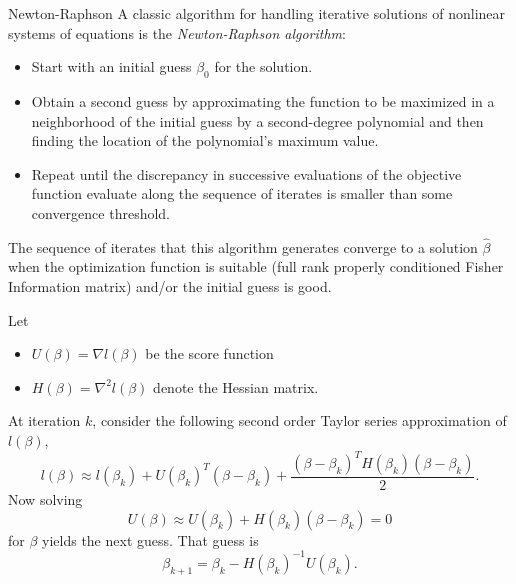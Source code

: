\documentclass[
  ignorenonframetext,
]{beamer}
\providecommand{\tightlist}{%
  \setlength{\itemsep}{0pt}\setlength{\parskip}{0pt}}
\begin{document}
\begin{frame}{Newton-Raphson}
\protect\hypertarget{newton-raphson}{}
A classic algorithm for handling iterative solutions of nonlinear
systems of equations is the \emph{Newton-Raphson algorithm}:

\begin{itemize}
\tightlist
\item
  Start with an initial guess \(\beta_0\) for the solution.
\item
  Obtain a second guess by approximating the function to be maximized in
  a neighborhood of the initial guess by a second-degree polynomial and
  then finding the location of the polynomial's maximum value.
\item
  Repeat until the discrepancy in successive evaluations of the
  objective function evaluate along the sequence of iterates is smaller
  than some convergence threshold.
\end{itemize}

The sequence of iterates that this algorithm generates converge to a
solution \(\hat\beta\) when the optimization function is suitable (full
rank properly conditioned Fisher Information matrix) and/or the initial
guess is good.
\end{frame}

\begin{frame}{}
\protect\hypertarget{section-3}{}
Let

\begin{itemize}
\tightlist
\item
  \(U(\beta) = \nabla l(\beta)\) be the score function
\item
  \(H(\beta) = \nabla^2 l(\beta)\) denote the Hessian matrix.
\end{itemize}

\vspace{12pt}

At iteration \(k\), consider the following second order Taylor series
approximation of \(l(\beta)\), \begin{equation} \label{NR}
  l(\beta) \approx l(\beta_k) + U(\beta_k)^T(\beta - \beta_k) 
    + \frac{(\beta-\beta_k)^TH(\beta_k)(\beta - \beta_k)}{2}.
\end{equation} Now solving \[
  U(\beta) \approx U(\beta_k) + H(\beta_k)(\beta - \beta_k) = 0
\] for \(\beta\) yields the next guess. That guess is
\begin{equation} \label{NRupdates}
    \beta_{k+1} = \beta_k - H(\beta_k)^{-1}U(\beta_k).
\end{equation}
\end{frame}
\end{document}
